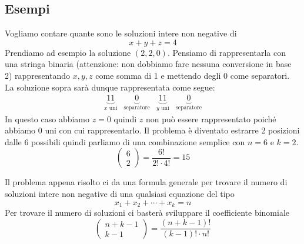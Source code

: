 \subsection{Esempi}

\begin{example}
	Vogliamo contare quante sono le soluzioni intere non negative di
	\begin{equation*}
		x + y + z = 4
	\end{equation*}
	Prendiamo ad esempio la soluzione $(2, 2, 0)$.
	Pensiamo di rappresentarla con una stringa binaria (attenzione: non dobbiamo fare nessuna
	conversione in base 2) rappresentando $x, y, z$ come somma di 1 e mettendo degli 0 come
	separatori. La soluzione sopra sar\`a dunque rappresentata come segue:
	\begin{equation*}
		\begin{array}{cccc}
			\underbrace{11}_{\text{$x$ uni}}   &
			\underbrace{0}_{\text{separatore}} &
			\underbrace{11}_{\text{$y$ uni}}   &
			\underbrace{0}_{\text{separatore}}
		\end{array}
	\end{equation*}
	In questo caso abbiamo $z = 0$ quindi $z$ non pu\`o essere rappresentato poich\'e abbiamo
	0 uni con cui rappresentarlo.
	Il problema \`e diventato estrarre 2 posizioni dalle 6 possibili quindi parliamo di una
	combinazione semplice con $n = 6$ e $k = 2$.
	\begin{equation*}
		\begin{pmatrix}
			6 \\ 2
		\end{pmatrix} =
		\frac{6!}{2! \cdot 4!} = 15
	\end{equation*}
\end{example}

Il problema appena risolto ci da una formula generale per trovare il numero di soluzioni
intere non negative di una qualsiasi equazione del tipo
\begin{equation*}
	x_1 + x_2 + \cdots + x_k = n
\end{equation*}
Per trovare il numero di soluzioni ci baster\`a sviluppare il coefficiente binomiale
\begin{equation*}
	\begin{pmatrix}
		n + k - 1 \\ k - 1
	\end{pmatrix} =
	\frac{(n + k - 1)!}{(k - 1)! \cdot n!}
\end{equation*}